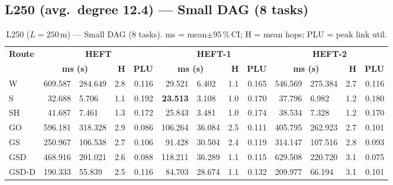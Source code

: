 \documentclass[11pt]{article}
\newcommand{\win}[1]{\textcolor{green!50!black}{\textbf{#1}}}
\newcommand{\bad}[1]{\textcolor{red!70!black}{#1}}
\begin{document}
\subsection{L250 (avg.\ degree 12.4) --- Small DAG (8 tasks)}
\begin{table}[H]\centering\small
\begin{tabular}{l r@{$\pm$}l r r r@{$\pm$}l r r r@{$\pm$}l r r}
\toprule
\textbf{Route} & \multicolumn{4}{c}{\textbf{HEFT}} & \multicolumn{4}{c}{\textbf{HEFT-1}} & \multicolumn{4}{c}{\textbf{HEFT-2}} \\
\cmidrule(lr){2-5}\cmidrule(lr){6-9}\cmidrule(lr){10-13}
& \multicolumn{2}{c}{\textbf{ms (s)}} & \textbf{H} & \textbf{PLU}& \multicolumn{2}{c}{\textbf{ms (s)}} & \textbf{H} & \textbf{PLU}& \multicolumn{2}{c}{\textbf{ms (s)}} & \textbf{H} & \textbf{PLU} \\
\midrule
  W & \bad{609.587} & 284.649 & 2.8 & 0.116 & 29.521 & 6.402 & 1.1 & 0.165 & 546.569 & 275.384 & 2.7 & 0.116 \\
  S & 32.688 & 5.706 & 1.1 & 0.192 & \win{23.513} & 3.108 & 1.0 & 0.170 & 37.796 & 6.982 & 1.2 & 0.180 \\
  SH & 41.687 & 7.461 & 1.3 & 0.172 & 25.843 & 3.481 & 1.0 & 0.174 & 38.534 & 7.328 & 1.2 & 0.170 \\
  GO & 596.181 & 318.328 & 2.9 & 0.086 & 106.264 & 36.084 & 2.5 & 0.111 & 405.795 & 262.923 & 2.7 & 0.101 \\
  GS & 250.967 & 106.538 & 2.7 & 0.106 & 91.428 & 30.504 & 2.4 & 0.119 & 314.147 & 107.516 & 2.8 & 0.093 \\
  GSD & 468.916 & 201.021 & 2.6 & 0.088 & \bad{118.211} & 36.289 & 1.1 & 0.115 & \bad{629.508} & 220.720 & 3.1 & 0.075 \\
  GSD-D & 190.333 & 55.839 & 2.5 & 0.116 & 84.703 & 28.674 & 1.1 & 0.132 & 209.977 & 66.194 & 3.1 & 0.101 \\
\bottomrule\end{tabular}
\caption{L250 ($L=250$\,m) --- Small DAG (8 tasks). ms = mean$\pm$95\,\%\,CI; H = mean hops; PLU = peak link util.}
\end{table}
\end{document}
